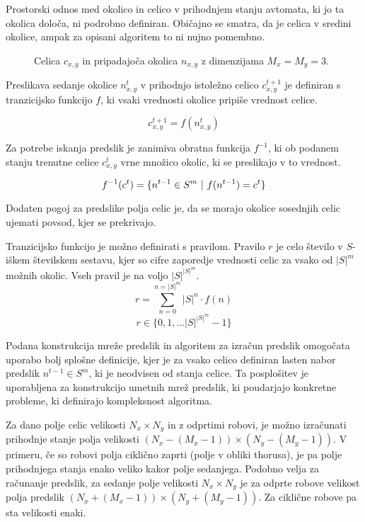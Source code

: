 \documentclass[12pt,a4paper,openany,twoside]{book}
\begin{document}
Prostorski odnos med okolico in celico v prihodnjem stanju avtomata, ki jo ta okolica določa,
ni podrobno definiran. Običajno se smatra, da je celica v sredini okolice, ampak za opisani algoritem to ni
nujno pomembno.

\begin{figure}[htb]
\centerline{}
\caption[Velikost okolice.]{Celica \(c_{x,y}\) in pripadajoča okolica \(n_{x,y}\) z dimenzijama \(M_x=M_y=3\).}
\label{neighborhood}
\end{figure}

Preslikava sedanje okolice \(n_{x,y}^{t}\) v prihodnjo istoležno celico \(c_{x,y}^{t+1}\) je definiran
s tranzicijsko funkcijo \(f\), ki vsaki vrednosti okolice pripiše vrednost celice.

\begin{equation}
c_{x,y}^{t+1} = f(n_{x,y}^{t})
\end{equation}

Za potrebe iskanja predslik je zanimiva obratna funkcija \(f^{-1}\), ki ob
podanem stanju trenutne celice \(c_{x,y}^{t}\) vrne množico okolic,
ki se preslikajo v to vrednost.

\begin{equation}
f^{-1}(c^{t}) = \{ n^{t-1} \in S^m \ \arrowvert \ f(n^{t-1}) = c^{t} \}
\end{equation}

Dodaten pogoj za predslike polja celic je, da se morajo okolice sosednjih celic
ujemati povsod, kjer se prekrivajo.

Tranzicijsko funkcijo je možno definirati s pravilom.
Pravilo \(r\) je celo število v \(S\)-iškem številskem sestavu,
kjer so cifre zaporedje vrednosti celic za vsako od \(|S|^m\) možnih okolic.
Vseh pravil je na voljo \(|S|^{|S|^m}\).
\begin{equation}
r = \sum_{n=0}^{n=|S|^m} |S|^n \cdot f(n)
\end{equation}
\begin{equation}
r \in \{0, 1, \dots |S|^{|S|^m}-1\}
\end{equation}

Podana konstrukcija mreže predslik in algoritem za izračun predslik omogočata uporabo
bolj splošne definicije, kjer je za vsako celico definiran lasten nabor predslik \( n^{t-1} \in S^m \),
ki je neodvisen od stanja celice. Ta posplošitev je uporabljena za konstrukcijo umetnih
mrež predslik, ki poudarjajo konkretne probleme, ki definirajo kompleksnost algoritma.

Za dano polje celic velikosti \(N_x \times N_y\) in z odprtimi robovi,
je možno izračunati prihodnje stanje polja velikosti \((N_x-(M_x-1)) \times (N_y-(M_y-1))\).
V primeru, če so robovi polja ciklično zaprti (polje v obliki thorusa),
je pa polje prihodnjega stanja enako veliko kakor polje sedanjega.
Podobno velja za računanje predslik, za sedanje polje velikosti \(N_x \times N_y\)
je za odprte robove velikost polja predslik \((N_x+(M_x-1)) \times (N_y+(M_y-1))\).
Za ciklične robove pa sta velikosti enaki.
\end{document}
